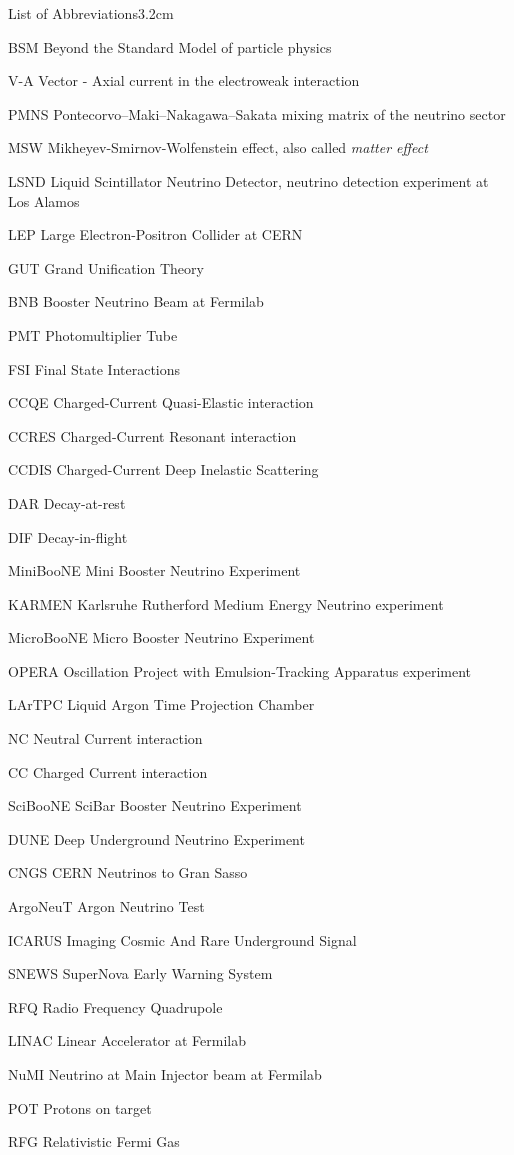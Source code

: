 \begin{mclistof}{List of Abbreviations}{3.2cm}

\item[BSM] Beyond the Standard Model of particle physics
\item[V-A] Vector - Axial current in the electroweak interaction
\item[PMNS] Pontecorvo–Maki–Nakagawa–Sakata mixing matrix of the neutrino sector
\item[MSW] Mikheyev-Smirnov-Wolfenstein effect, also called \emph{matter effect}
\item[LSND] Liquid Scintillator Neutrino Detector, neutrino detection experiment at Los Alamos
\item[LEP] Large Electron-Positron Collider at CERN
\item[GUT] Grand Unification Theory
\item[BNB] Booster Neutrino Beam at Fermilab
\item[PMT] Photomultiplier Tube
\item[FSI] Final State Interactions 
\item[CCQE] Charged-Current Quasi-Elastic interaction
\item[CCRES] Charged-Current Resonant interaction
\item[CCDIS] Charged-Current Deep Inelastic Scattering
\item[DAR] Decay-at-rest
\item[DIF] Decay-in-flight
\item[MiniBooNE] Mini Booster Neutrino Experiment
\item[KARMEN] Karlsruhe Rutherford Medium Energy Neutrino experiment
\item[MicroBooNE] Micro Booster Neutrino Experiment
\item[OPERA] Oscillation Project with Emulsion-Tracking Apparatus experiment
\item[LArTPC] Liquid Argon Time Projection Chamber
\item[NC] Neutral Current interaction
\item[CC] Charged Current interaction
\item[SciBooNE] SciBar Booster Neutrino Experiment
\item[DUNE] Deep Underground Neutrino Experiment
\item[CNGS] CERN Neutrinos to Gran Sasso
\item[ArgoNeuT] Argon Neutrino Test
\item[ICARUS] Imaging Cosmic And Rare Underground Signal
\item[SNEWS] SuperNova Early Warning System
\item[RFQ] Radio Frequency Quadrupole
\item[LINAC] Linear Accelerator at Fermilab
\item[NuMI] Neutrino at Main Injector beam at Fermilab
\item[POT] Protons on target
\item[RFG] Relativistic Fermi Gas
\end{mclistof} 
